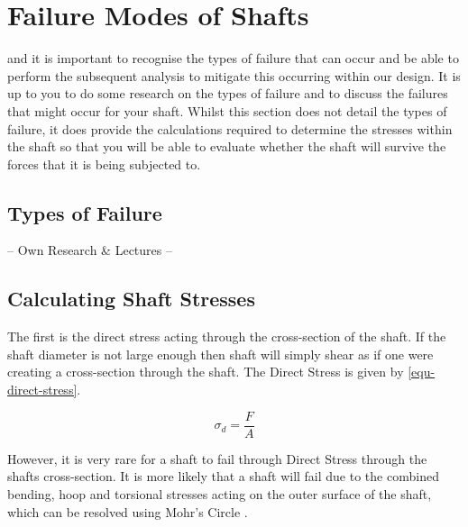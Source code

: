 \section{Failure Modes of Shafts}

 and it is important to recognise the types of failure that can occur and be able to perform the subsequent analysis to mitigate this occurring within our design. It is up to you to do some research on the types of failure and to discuss the failures that might occur for your shaft. Whilst this section does not detail the types of failure, it does provide the calculations required to determine the stresses within the shaft so that you will be able to evaluate whether the shaft will survive the forces that it is being subjected to.

\subsection{Types of Failure}

\begin{framed}
    \vspace{1cm}
    \begin{center}
        \Large
        -- Own Research \& Lectures --
    \end{center}
    \vspace{1cm}
\end{framed}

\subsection{Calculating Shaft Stresses}

 The first is the direct stress acting through the cross-section of the shaft.
If the shaft diameter is not large enough then shaft will simply shear as if one were creating a cross-section through the shaft.
The Direct Stress is given by \cref{equ-direct-stress}.

\begin{equation}
    \sigma_d = \frac{F}{A}
    \label{equ-direct-stress}
\end{equation}

However, it is very rare for a shaft to fail through Direct Stress through the shafts cross-section. It is more likely that a shaft will fail due to the combined bending, hoop and torsional stresses acting on the outer surface of the shaft, which can be resolved using Mohr's Circle .

